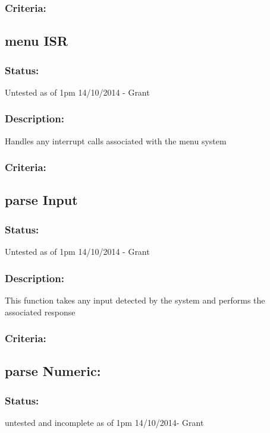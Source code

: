 \documentclass[]{report}
\begin{document}
\subsubsection{Criteria:}

\subsection{menu ISR}
\subsubsection{Status:}
Untested as of 1pm 14/10/2014 - Grant

\subsubsection{Description:}
Handles any interrupt calls associated with the menu system

\subsubsection{Criteria:}

\subsection{parse Input}
\subsubsection{Status:}
Untested as of 1pm 14/10/2014 - Grant

\subsubsection{Description:}
This function takes any input detected by the system and performs the associated response

\subsubsection{Criteria:}

\subsection{parse Numeric:}
\subsubsection{Status:}
untested and incomplete as of 1pm 14/10/2014- Grant
\end{document}
